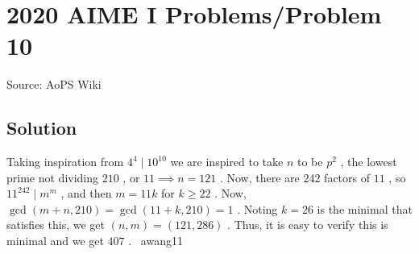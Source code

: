 \documentclass[12pt]{article}
\begin{document}
\section*{{2020 AIME I Problems/Problem 10}}
Source: AoPS Wiki

\subsection*{Solution}
Taking inspiration from $4^4 \mid 10^{10}$ we are inspired to take $n$ to be $p^2$ , the lowest prime not dividing $210$ , or $11 \implies n = 121$ . Now, there are $242$ factors of $11$ , so $11^{242} \mid m^m$ , and then $m = 11k$ for $k \geq 22$ . Now, $\gcd(m+n, 210) = \gcd(11+k,210) = 1$ . Noting $k = 26$ is the minimal that satisfies this, we get $(n,m) = (121,286)$ . Thus, it is easy to verify this is minimal and we get $\boxed{407}$ . ~awang11
\end{document}
